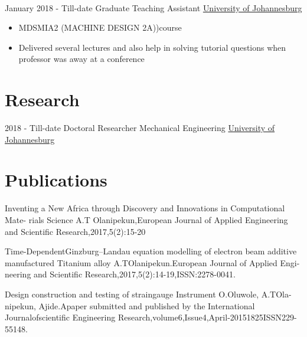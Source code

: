\documentclass[letterpaper]{twentysecondcv} %
\begin{document}
\begin{twenty}
{{\begin{itemize}
        

    \end{itemize}}
        }
    \\   
    \twentyitem
   		{January 2018 -}
		{Till-date}
        {Graduate Teaching Assistant}
        {\href{http://www.uj.ac.za}{University of Johannesburg}}
        {}
        {
        {\begin{itemize}
        \item MDSMIA2 (MACHINE DESIGN 2A))course

        \item Delivered several lectures and also help in solving tutorial questions when professor was away at a conference
    \end{itemize}}
        }
     
        
\end{twenty}

\section{Research}
\begin{twenty}
	\twentyitem
    	{2018 - Till-date}
		{}
        {Doctoral Researcher Mechanical Engineering}
        {\href{http://www.uj.ac.za/}{University of Johannesburg}}
        {}
        {
       	
       
        }
\end{twenty}

\section{Publications}
Inventing a New Africa through Discovery and Innovations in Computational Mate-
rials Science A.T Olanipekun,European Journal of Applied Engineering and Scientific
Research,2017,5(2):15-20

Time-DependentGinzburg–Landau equation modelling of electron beam additive
manufactured Titanium alloy A.TOlanipekun.European Journal of Applied Engi-
neering and Scientific Research,2017,5(2):14-19,ISSN:2278-0041.

Design construction and testing of straingauge Instrument O.Oluwole, A.TOla-
nipekun, Ajide.Apaper submitted and published by the International Journalofscientific Engineering Research,volume6,Issue4,April-20151825ISSN229-55148.
\end{document}
